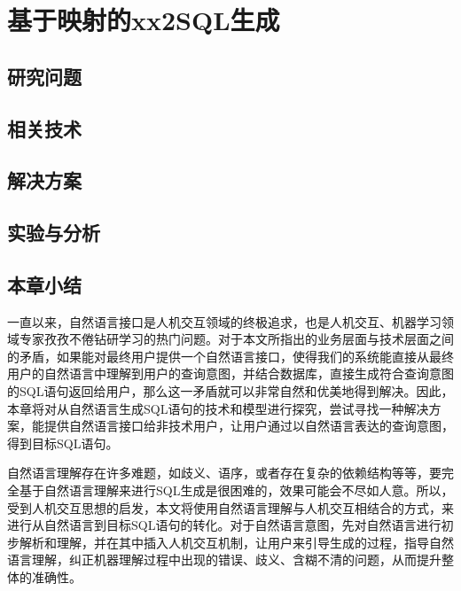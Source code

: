 \chapter{基于映射的xx2SQL生成}
\label{chap:interaction}
\section{研究问题}
\section{相关技术}
\section{解决方案}
\section{实验与分析}
\section{本章小结}

一直以来，自然语言接口是人机交互领域的终极追求，也是人机交互、机器学习领域专家孜孜不倦钻研学习的热门问题。对于本文所指出的业务层面与技术层面之间的矛盾，如果能对最终用户提供一个自然语言接口，使得我们的系统能直接从最终用户的自然语言中理解到用户的查询意图，并结合数据库，直接生成符合查询意图的SQL语句返回给用户，那么这一矛盾就可以非常自然和优美地得到解决。因此，本章将对从自然语言生成SQL语句的技术和模型进行探究，尝试寻找一种解决方案，能提供自然语言接口给非技术用户，让用户通过以自然语言表达的查询意图，得到目标SQL语句。

自然语言理解存在许多难题，如歧义、语序，或者存在复杂的依赖结构等等，要完全基于自然语言理解来进行SQL生成是很困难的，效果可能会不尽如人意。所以，受到人机交互思想的启发，本文将使用自然语言理解与人机交互相结合的方式，来进行从自然语言到目标SQL语句的转化。对于自然语言意图，先对自然语言进行初步解析和理解，并在其中插入人机交互机制，让用户来引导生成的过程，指导自然语言理解，纠正机器理解过程中出现的错误、歧义、含糊不清的问题，从而提升整体的准确性。

